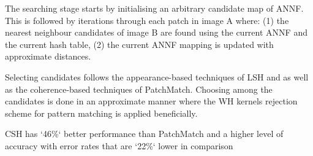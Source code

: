The searching stage starts by initialising an arbitrary candidate map of ANNF. This is followed by iterations through each patch in image A where: (1) the nearest neighbour candidates of image B are found using the current ANNF and the current hash table, (2) the current ANNF mapping is updated with approximate distances. 

Selecting candidates follows the appearance-based techniques of LSH and as well as the coherence-based techniques of PatchMatch. Choosing among the candidates is done in an approximate manner where the WH kernels rejection scheme for pattern matching is applied beneficially. 

CSH has `46\%` better performance than PatchMatch and a higher level of accuracy with error rates that are `22\%` lower in comparison






